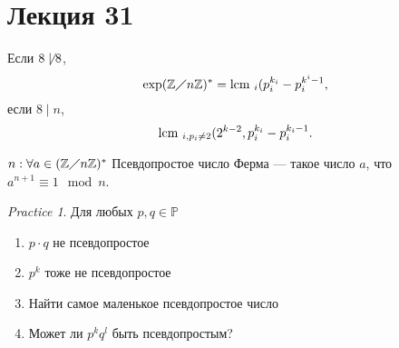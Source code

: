 \documentclass[11pt]{book}
\newcommand{\Z}{\mathbb{Z}}
\newcommand{\Pm}{\mathbb{P}}
\newcommand{\lcm}{{\mathop{\text{\rm lcm}}}~}
\theoremstyle{definition}
\theoremstyle{plain}
\theoremstyle{plain}
\theoremstyle{definition}
\theoremstyle{remark}
\newtheorem*{prac}{Practice}
\begin{document}
 \section{Лекция 31}
 \begin{thm}[Карнайкера]
     Если $ 8 \not\mid 8$,
     \[
	 \exp (\Z \diagup n \Z)^{*}= \lcm _i (p_i^{k_i} - p_i^{k^{i}-1}
     ,\] 
     если $ 8 \mid n$,
      \[
	  \lcm_{i, p_i \ne 2}(2^{k-2}, p_i^{k_i} - p_i^{k_i-1}
     .\] 
 \end{thm}
 \begin{defn}
     $ n: \forall  a \in  (\Z \diagup n \Z)^{*}$
     Псевдопростое число Ферма --- такое число $ a$, что $ a^{n+1} \equiv 1 \mod n$.
 \end{defn}
 \begin{prac}
     Для любых $ p, q \in  \Pm$ 
     \begin{enumerate}
         \item 
     $ p \cdot  q$ не псевдопростое
     \item  $ p^{k}$  тоже не псевдопростое
	 \item Найти самое маленькое псевдопростое число
	     \item  Может ли $ p^{k}q^{l}$ быть псевдопростым?
     \end{enumerate}
 \end{prac}
\end{document}
